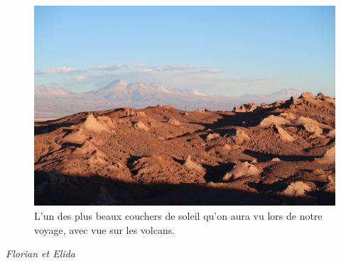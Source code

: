 \begin{figure}
\centering
\includegraphics{images/20180904_sanpedrocoucher.JPG}
\caption{L'un des plus beaux couchers de soleil qu'on aura vu lors de
notre voyage, avec vue sur les volcans.}
\end{figure}

\emph{Florian et Elida}
